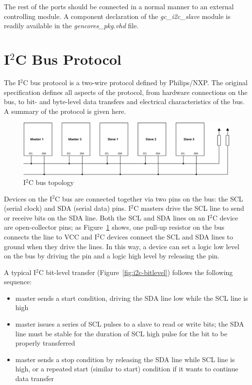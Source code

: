 \documentclass[a4paper,11pt]{article}
\begin{document}
\pagebreak
The rest of the ports should be connected in a normal manner to an external controlling module. A
component declaration of the \textit{gc\_i2c\_slave} module is readily available in the
\textit{gencores\_pkg.vhd} file.

\section{I$^2$C Bus Protocol}
The I$^2$C bus protocol is a two-wire protocol defined by Philips/NXP. The original 
specification \cite{i2c-spec} defines all aspects of the protocol, from hardware 
connections on the bus, to bit- and byte-level data transfers and electrical
characteristics of the bus. A summary of the protocol is given here.

\begin{figure}[h]
  \centerline{\includegraphics[width=\textwidth]{fig/i2c-bus}}
  \caption{I$^2$C bus topology}
  \label{fig:i2c-bus}
\end{figure}

Devices on the I$^2$C bus are connected together via two pins on the bus: the SCL 
(serial clock) and SDA (serial data) pins. I$^2$C masters drive the SCL line to send or
receive bits on the SDA line. Both the SCL and SDA lines on an I$^2$C device are open-collector
pins; as Figure~\ref{fig:i2c-bus} shows, one pull-up resistor on the bus connects the line to 
VCC and I$^2$C devices connect the SCL and SDA lines to ground when they drive the lines. 
In this way, a device can set a logic low level on the bus by driving the pin and a logic 
high level by releasing the pin.

A typical I$^2$C bit-level transfer (Figure~\ref{fig:i2c-bitlevel}) follows the following sequence:
\begin{itemize}
  \item master sends a start condition, driving the SDA line low while the SCL line is high
  \item master issues a series of SCL pulses to a slave to read or write bits;
  the SDA line must be stable for the duration of SCL high pulse for the bit to be properly
  transferred
  \item master sends a stop condition by releasing the SDA line while SCL line is high,
  or a repeated start (similar to start) condition if it wants to continue data transfer
\end{itemize}
\end{document}
